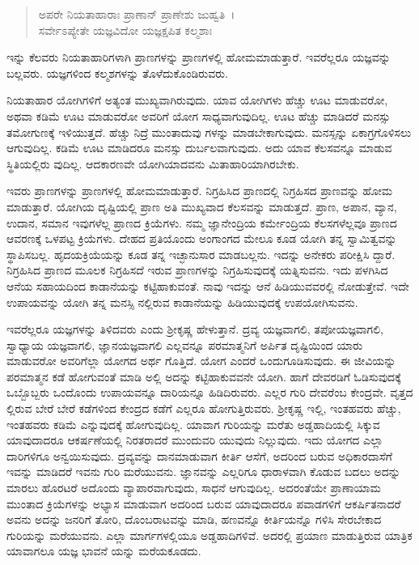 \begin{verse}
ಅಪರೇ ನಿಯತಾಹಾರಾಃ ಪ್ರಾಣಾನ್ ಪ್ರಾಣೇಶು ಜುಹ್ವತಿ~।\\ಸರ್ವೇಽಪ್ಯೇತೇ ಯಜ್ಞವಿದೋ ಯಜ್ಞಕ್ಷಪಿತ ಕಲ್ಮಶಾಃ 
\end{verse}

{\small ಇನ್ನು ಕೆಲವರು ನಿಯತಾಹಾರಿಗಳಾಗಿ ಪ್ರಾಣಗಳನ್ನು ಪ್ರಾಣಗಳಲ್ಲಿ ಹೋಮಮಾಡುತ್ತಾರೆ. ಇವರೆಲ್ಲರೂ ಯಜ್ಞವನ್ನು ಬಲ್ಲವರು. ಯಜ್ಞಗಳಿಂದ ಕಲ್ಮಶಗಳನ್ನು ತೊಳೆದುಕೊಂಡಿರುವರು.}

ನಿಯತಾಹಾರ ಯೋಗಿಗಳಿಗೆ ಅತ್ಯಂತ ಮುಖ್ಯವಾಗಿರುವುದು. ಯಾವ ಯೋಗಿಗಳು ಹೆಚ್ಚು ಊಟ ಮಾಡುವರೋ, ಅಥವಾ ಕಡಿಮೆ ಊಟ ಮಾಡುವರೋ ಅವರಿಗೆ ಯೋಗ ಸಾಧ್ಯವಾಗುವುದಿಲ್ಲ. ಊಟ ಹೆಚ್ಚು ಮಾಡಿದರೆ ಮನಸ್ಸು ತಮೋಗುಣಕ್ಕೆ ಇಳಿಯುತ್ತದೆ. ಹೆಚ್ಚು ನಿದ್ರೆ ಮುಂತಾದುವು ಗಳನ್ನು ಮಾಡಬೇಕಾಗುವುದು. ಮನಸ್ಸನ್ನು ಏಕಾಗ್ರಗೊಳಿಸಲು ಆಗುವುದಿಲ್ಲ. ಕಡಿಮೆ ಊಟ ಮಾಡಿದರೂ ಮನಸ್ಸು ದುರ್ಬಲವಾಗುವುದು. ಅದು ಯಾವ ಕೆಲಸವನ್ನೂ ಮಾಡುವ ಸ್ಥಿತಿಯಲ್ಲಿರು ವುದಿಲ್ಲ. ಆದಕಾರಣವೇ ಯೋಗಿಯಾದವನು ಮಿತಾಹಾರಿಯಾಗಿರಬೇಕು.

ಇವರು ಪ್ರಾಣಗಳನ್ನು ಪ್ರಾಣಗಳಲ್ಲಿ ಹೋಮಮಾಡುತ್ತಾರೆ. ನಿಗ್ರಹಿಸಿದ ಪ್ರಾಣದಲ್ಲಿ ನಿಗ್ರಹಿಸದ ಪ್ರಾಣವನ್ನು ಹೋಮ ಮಾಡುತ್ತಾರೆ. ಯೋಗಿಯ ದೃಷ್ಟಿಯಲ್ಲಿ ಪ್ರಾಣ ಅತಿ ಮುಖ್ಯವಾದ ಕೆಲಸವನ್ನು ಮಾಡುತ್ತದೆ. ಪ್ರಾಣ, ಅಪಾನ, ವ್ಯಾನ, ಉದಾನ, ಸಮಾನ ಇವುಗಳೆಲ್ಲ ಪ್ರಾಣದ ಕ್ರಿಯೆಗಳು. ನಮ್ಮ ಜ್ಞಾನೇಂದ್ರಿಯ ಕರ್ಮೇಂದ್ರಿಯ ಕೆಲಸಗಳೆಲ್ಲವೂ ಪ್ರಾಣದ ಆವರಣಕ್ಕೆ ಒಳಪಟ್ಟ ಕ್ರಿಯೆಗಳು. ದೇಹದ ಪ್ರತಿಯೊಂದು ಅಂಗಾಂಗದ ಮೇಲೂ ಕೂಡ ಯೋಗಿ ತನ್ನ ಸ್ವಾಮಿತ್ವವನ್ನು ಸ್ಥಾಪಿಸಬಲ್ಲ. ಹೃದಯಕ್ರಿಯೆಯನ್ನು ಕೂಡ ತನ್ನ ಇಚ್ಛಾನುಸಾರ ಮಾಡಬಲ್ಲನು. ಇದನ್ನು ಅನೇಕರು ಪರೀಕ್ಷಿಸಿ ದ್ದಾರೆ. ನಿಗ್ರಹಿಸಿದ ಪ್ರಾಣದ ಮೂಲಕ ನಿಗ್ರಹಿಸದೆ ಇರುವ ಪ್ರಾಣಗಳನ್ನು ನಿಗ್ರಹಿಸುವುದಕ್ಕೆ ಯತ್ನಿಸುವನು. ಇದು ಪಳಗಿಸಿದ ಆನೆಯ ಸಹಾಯದಿಂದ ಕಾಡಾನೆಯನ್ನು ಕಟ್ಟಿಹಾಕುವಂತೆ. ನಾವು ಇದನ್ನು ಆನೆ ಹಿಡಿಯುವವರಲ್ಲಿ ನೋಡುತ್ತೇವೆ. ಇದೇ ಉಪಾಯವನ್ನು ಯೋಗಿ ತನ್ನ ಮನಸ್ಸಿ ನಲ್ಲಿರುವ ಕಾಡಾನೆಯನ್ನು ಹಿಡಿಯುವುದಕ್ಕೆ ಉಪಯೋಗಿಸುವನು.

ಇವರೆಲ್ಲರೂ ಯಜ್ಞಗಳನ್ನು ತಿಳಿದವರು ಎಂದು ಶ‍್ರೀಕೃಷ್ಣ ಹೇಳುತ್ತಾನೆ. ದ್ರವ್ಯ ಯಜ್ಞವಾಗಲಿ, ತಪೋಯಜ್ಞವಾಗಲಿ, ಸ್ವಾಧ್ಯಾಯ ಯಜ್ಞವಾಗಲಿ, ಜ್ಞಾನಯಜ್ಞವಾಗಲಿ ಎಲ್ಲವನ್ನೂ ಪರಮಾತ್ಮನಿಗೆ ಅರ್ಪಿತ ದೃಷ್ಟಿಯಿಂದ ಯಾರು ಮಾಡುವರೋ ಅವರಿಗೆಲ್ಲಾ ಯೋಗದ ಅರ್ಥ ಗೊತ್ತಿದೆ. ಯೋಗ ಎಂದರೆ ಒಂದುಗೂಡಿಸುವುದು. ಈ ಜೀವಿಯನ್ನು ಪರಮಾತ್ಮನ ಕಡೆ ಹೋಗುವಂತೆ ಮಾಡಿ ಅಲ್ಲಿ ಅದನ್ನು ಕಟ್ಟಿಹಾಕುವವನೇ ಯೋಗಿ. ಹಾಗೆ ದೇವರಡಿಗೆ ಓಡಿಸುವುದಕ್ಕೆ ಒಬ್ಬೊಬ್ಬರು ಒಂದೊಂದು ಉಪಾಯವನ್ನೂ ದಾರಿಯನ್ನೂ ಹಿಡಿದಿರುವರು. ಎಲ್ಲರ ಗುರಿ ದೇವರೆಂಬ ಕೇಂದ್ರವೇ. ವೃತ್ತದ ಲ್ಲಿರುವ ಬೇರೆ ಬೇರೆ ಕಡೆಗಳಿಂದ ಕೇಂದ್ರದ ಕಡೆಗೆ ಎಲ್ಲರೂ ಹೋಗುತ್ತಿರುವರು. ಶ‍್ರೀಕೃಷ್ಣ ಇಲ್ಲಿ, ಇಂತಹವರು ಹೆಚ್ಚು, ಇಂತಹವರು ಕಡಿಮೆ ಎನ್ನುವುದಕ್ಕೆ ಹೋಗುವುದಿಲ್ಲ. ಯಾವಾಗ ಗುರಿಯನ್ನು ಮರೆತು ಅಡ್ಡಹಾದಿಯಲ್ಲಿ ಸಿಕ್ಕುವ ಯಾವುದಾದರೂ ಆಕರ್ಷಣೆಯಲ್ಲಿ ನಿರತರಾದರೆ ಮುಂದುವರಿ ಯುವುದು ನಿಲ್ಲುವುದು. ಇದು ಯೋಗದ ಎಲ್ಲಾ ದಾರಿಗಳಿಗೂ ಅನ್ವಯಿಸುವುದು. ದ್ರವ್ಯವನ್ನು ದಾನಮಾಡುವಾಗ ಕೀರ್ತಿ ಆಸೆಗೆ, ಅದರಿಂದ ಬರುವ ಅಧಿಕಾರದಾಸೆಗೆ ಇವನ್ನು ಮಾಡಿದರೆ ಇವನು ಗುರಿ ಮರೆಯುವನು. ಜ್ಞಾನವನ್ನು ಎಲ್ಲರಿಗೂ ಧಾರಾಳವಾಗಿ ಕೊಡುವ ಬದಲು ಅದನ್ನು ಮಾರಲು ಹೊರಟರೆ ಅದೊಂದು ವ್ಯಾಪಾರವಾಗುವುದು, ಸಾಧನೆ ಆಗುವುದಿಲ್ಲ. ಅದರಂತೆಯೇ ಪ್ರಾಣಾಯಾಮ ಮುಂತಾದ ಕ್ರಿಯೆಗಳನ್ನು ಅಭ್ಯಾಸ ಮಾಡುವಾಗ ಅದರಿಂದ ಬರುವ ಯಾವುದಾದರೂ ಪವಾಡಗಳಿಗೆ ಆಕರ್ಷಿತನಾದರೆ ಅವನು ಅದನ್ನು ಜನರಿಗೆ ತೋರಿ, ದೊಂಬರಾಟವನ್ನು ಮಾಡಿ, ಹಣವನ್ನೊ ಕೀರ್ತಿಯನ್ನೊ ಗಳಿಸಿ ಸೇರಬೇಕಾದ ಗುರಿಯನ್ನು ಮರೆಯುವನು. ಎಲ್ಲಾ ಮಾರ್ಗಗಳಲ್ಲಿಯೂ ಅಡ್ಡಹಾದಿಗಳಿವೆ. ಅದರಲ್ಲಿ ಪ್ರಯಾಣ ಮಾಡುತ್ತಿರುವ ಯಾತ್ರಿಕ ಯಾವಾಗಲೂ ಯಜ್ಞ ಭಾವನೆ ಯನ್ನು ಮರೆಯಕೂಡದು.

